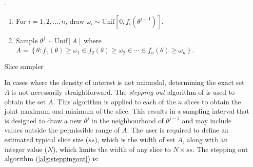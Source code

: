 -\documentclass[article]{jss}
\begin{document}
%
\begin{algorithm}[H]
\begin{enumerate}
\item For $i=1,2,\dots,n$, draw $\omega_{i}\sim\mbox{Unif}[0,f_{i}(\theta^{j-1})]$. 
\item Sample $\theta^{j}\sim\mbox{Unif}[A]$ where $A=\left\{ \theta:f_{1}(\theta)\ge\omega_{1}\in f_{2}(\theta)\ge\omega_{2}\in\cdots\in f_{n}(\theta)\ge\omega_{n}\right\} $. 
\end{enumerate}
\caption{Slice sampler}
\label{alg:slicesamp}
\end{algorithm}


In cases where the density of interest is not unimodal, determining
the exact set $A$ is not necessarily straightforward. The
\emph{stepping out} algorithm of \citet{Radford2003} is used to obtain
the set $A$.  This algorithm is applied to each of the $n$ slices to
obtain the joint maximum and minimum of the slice. This results in a
sampling interval that is designed to draw a new $\theta^{j}$ in the
neighbourhood of $\theta^{j-1}$ and may include values outside the
permissible range of $A$. The user is required to define an estimated
typical slice size ($ss$), which is the width of set $A$, along with
an integer value ($N$), which limits the width of any slice to $N\times ss$.
The stepping out algorithm (\ref{alg:steppingout}) is:
\end{document}
